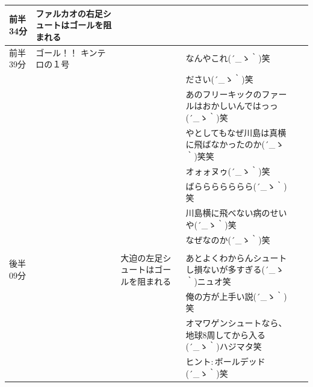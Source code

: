 \begin{table}[htb]
{\begin{tabular}{|l|l|l|l|l|l|}
      前半34分  & ファルカオの右足シュートはゴールを阻まれる   &                                       & \\ \hline
      前半39分  & ゴール！！ キンテロの１号                    &                                       & なんやこれ\sf (´\_ゝ｀)笑\\ \hline
                &                                              &                                       & ださい\sf (´\_ゝ｀)笑\\ \hline
                &                                              &                                       & あのフリーキックのファールはおかしいんではっっ\sf (´\_ゝ｀)笑\\ \hline
                &                                              &                                       & やとしてもなぜ川島は真横に飛ばなかったのか\sf (´\_ゝ｀)笑笑 \\ \hline
                &                                              &                                       & オォォヌゥ\sf (´\_ゝ｀)笑 \\ \hline
                &                                              &                                       & ばららららららら\sf (´\_ゝ｀)笑 \\ \hline
                &                                              &                                       & 川島横に飛べない病のせいや\sf (´\_ゝ｀)笑 \\ \hline
                &                                              &                                       & なぜなのか\sf (´\_ゝ｀)笑 \\ \hline
                &                                              &                                       &  \\ \hline
      後半09分  &                                              & 大迫の左足シュートはゴールを阻まれる  & あとよくわからんシュートし損ないが多すぎる\sf (´\_ゝ｀)ニュオ笑 \\ \hline
                &                                              &                                       & 俺の方が上手い説\sf (´\_ゝ｀)笑 \\ \hline
                &                                              &                                       & オマワゲンシュートなら、地球8周してから入る\sf (´\_ゝ｀)ハジマタ笑  \\ \hline
                &                                              &                                       & ヒント$:$ボールデッド\sf (´\_ゝ｀)笑 \\ \hline

\end{tabular}}
\end{table}
